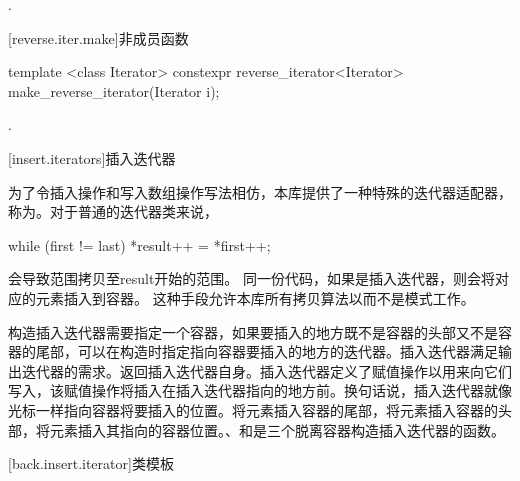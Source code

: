 \begin{itemdescr}
\pnum
\returns
{}.
\end{itemdescr}

[reverse.iter.make]{非成员函数}

%
\begin{itemdecl}
template <class Iterator>
  constexpr reverse_iterator<Iterator> make_reverse_iterator(Iterator i);
\end{itemdecl}

\begin{itemdescr}
\pnum
\returns
{}.
\end{itemdescr}

[insert.iterators]{插入迭代器}

\pnum
为了令插入操作和写入数组操作写法相仿，本库提供了一种特殊的迭代器适配器，称为。对于普通的迭代器类来说，

\begin{codeblock}
while (first != last) *result++ = *first++;
\end{codeblock}

会导致范围拷贝至result开始的范围。
同一份代码，如果是插入迭代器，则会将对应的元素插入到容器。
这种手段允许本库所有拷贝算法以而不是模式工作。

\pnum
构造插入迭代器需要指定一个容器，如果要插入的地方既不是容器的头部又不是容器的尾部，可以在构造时指定指向容器要插入的地方的迭代器。插入迭代器满足输出迭代器的需求。返回插入迭代器自身。插入迭代器定义了赋值操作以用来向它们写入，该赋值操作将插入在插入迭代器指向的地方前。换句话说，插入迭代器就像光标一样指向容器将要插入的位置。将元素插入容器的尾部，将元素插入容器的头部，将元素插入其指向的容器位置。、和是三个脱离容器构造插入迭代器的函数。

[back.insert.iterator]{类模板}

